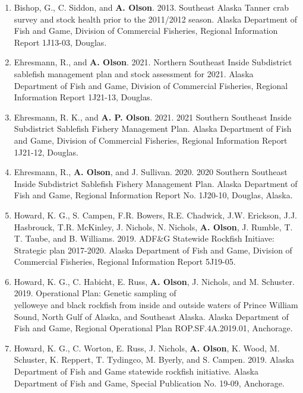 \documentclass[10pt,a4paper,ragged2e]{altacv}
\begin{document}

\smallskip
\begin{fullwidth}
\begin{enumerate}
\normalsize
\item Bishop, G., C. Siddon, and \textbf{A. Olson}. 2013. Southeast Alaska Tanner crab survey and stock health prior to the 2011/2012 season. Alaska Department of Fish and Game, Division of Commercial Fisheries, Regional Information Report 1J13-03, Douglas.
\vspace{0.15cm}
\item Ehresmann, R., and \textbf{A. Olson}. 2021. Northern Southeast Inside Subdistrict sablefish management plan and stock assessment for 2021. Alaska Department of Fish and Game, Division of Commercial Fisheries, Regional Information Report 1J21-13, Douglas.
\vspace{0.15cm}
\item Ehresmann, R. K., and \textbf{A. P. Olson}. 2021. 2021 Southern Southeast Inside Subdistrict Sablefish Fishery Management Plan. Alaska Department of Fish and Game, Division of Commercial Fisheries, Regional Information Report 1J21-12, Douglas.
\vspace{0.15cm}
\item Ehresmann, R., \textbf{A. Olson}, and J. Sullivan. 2020. 2020 Southern Southeast Inside Subdistrict Sablefish Fishery Management Plan. Alaska Department of Fish and Game, Regional Information Report No. 1J20-10, Douglas, Alaska.
\vspace{0.15cm}
\item Howard, K. G., S. Campen, F.R. Bowers, R.E. Chadwick, J.W. Erickson, J.J. Hasbrouck, T.R. McKinley, J. Nichols, N. Nichols, \textbf{A. Olson}, J. Rumble, T. T. Taube, and B. Williams. 2019. ADF\&G Statewide Rockfish Initiave: Strategic plan 2017-2020. Alaska Department of Fish and Game, Division of Commercial Fisheries, Regional Information Report 5J19-05.
\vspace{0.15cm}
\item Howard, K. G., C. Habicht, E. Russ, \textbf{A. Olson}, J. Nichols, and M. Schuster. 2019. Operational Plan: Genetic sampling of \\yelloweye and black rockfish from inside and outside waters of Prince William Sound, North Gulf of Alaska, and Southeast Alaska. Alaska Department of Fish and Game, Regional Operational Plan ROP.SF.4A.2019.01, Anchorage.
\vspace{0.15cm}
\item Howard, K. G., C. Worton, E. Russ, J. Nichols, \textbf{A. Olson}, K. Wood, M. Schuster, K. Reppert, T. Tydingco, M. Byerly, and S. Campen. 2019. Alaska Department of Fish and Game statewide rockfish initiative. Alaska Department of Fish and Game, Special Publication No. 19-09, Anchorage.

\end{enumerate}
\end{fullwidth}
\end{document}
